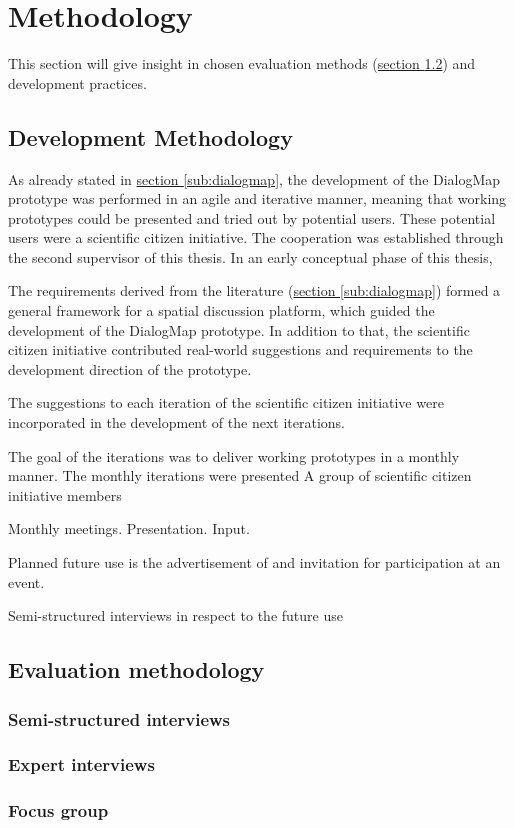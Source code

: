 \section{Methodology}
\label{chap:methodology}
This section will give insight in chosen evaluation methods (\hyperref[subchap:ev_methodology]{section \ref{subchap:ev_methodology}}) and development practices.


\subsection{Development Methodology}
As already stated in \hyperref[sub:dialogmap]{section \ref{sub:dialogmap}}, the development of the DialogMap prototype was performed in an agile and iterative manner, meaning that working prototypes could be presented and tried out by potential users. These potential users were a scientific citizen initiative. The cooperation was established through the second supervisor of this thesis.   In an early conceptual phase of this thesis, 


The requirements derived from the literature (\hyperref[sub:dialogmap]{section \ref{sub:dialogmap}}) formed a general framework for a spatial discussion platform, which guided the development of the DialogMap prototype. In addition to that, the scientific citizen initiative contributed real-world suggestions and requirements to the development direction of the prototype.


The suggestions to each iteration of the scientific citizen initiative were incorporated in the development of the next iterations. 



The goal of the iterations was to deliver working prototypes in a monthly manner. The monthly iterations were presented A group of scientific citizen initiative members 


Monthly meetings. Presentation. Input.

Planned future use is the advertisement of and invitation for participation at an event.

Semi-structured interviews in respect to the future use

\subsection{Evaluation methodology}
\label{subchap:ev_methodology}

\subsubsection{Semi-structured interviews}

\subsubsection{Expert interviews}

\subsubsection{Focus group}

